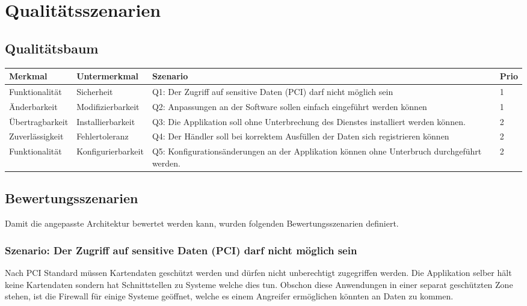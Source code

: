 \chapter{Qualitätsszenarien}
\label{sec:qualityscenarios}

\section{Qualitätsbaum}
\begin{table}[H]
	\centering
	\begin{tabular}{ | p{3cm} | p{3.5cm} | p{6.5cm} | p{1cm} | }
		\toprule
		{\textbf{Merkmal}} & {\textbf{Untermerkmal}} & {\textbf{Szenario}} & {\textbf{Prio}} \\
		\midrule
		Funktionalität & Sicherheit & Q1: Der Zugriff auf sensitive Daten (PCI) darf nicht möglich sein & 1 \\ \hline
		Änderbarkeit & Modifizierbarkeit & Q2: Anpassungen an der Software sollen einfach eingeführt werden können & 1 \\ \hline
		Übertragbarkeit & Installierbarkeit & Q3: Die Applikation soll ohne Unterbrechung des Dienstes installiert werden können. & 2 \\ \hline
		Zuverlässigkeit & Fehlertoleranz & Q4: Der Händler soll bei korrektem Ausfüllen der Daten sich registrieren können & 2 \\ \hline
		Funktionalität & Konfigurierbarkeit & Q5: Konfigurationsänderungen an der Applikation können ohne Unterbruch durchgeführt werden. & 2 \\
		\bottomrule
	\end{tabular}
\end{table}
\newpage
\section{Bewertungsszenarien}

Damit die angepasste Architektur bewertet werden kann, wurden folgenden Bewertungsszenarien definiert. 

\subsection{Szenario: Der Zugriff auf sensitive Daten (PCI) darf nicht möglich sein}
Nach PCI Standard müssen Kartendaten geschützt werden und dürfen nicht unberechtigt zugegriffen werden. Die Applikation selber hält keine Kartendaten sondern hat Schnittstellen zu Systeme welche dies tun. Obschon diese Anwendungen in einer separat geschützten Zone stehen, ist die Firewall für einige Systeme geöffnet, welche es einem Angreifer ermöglichen könnten an Daten zu kommen.

